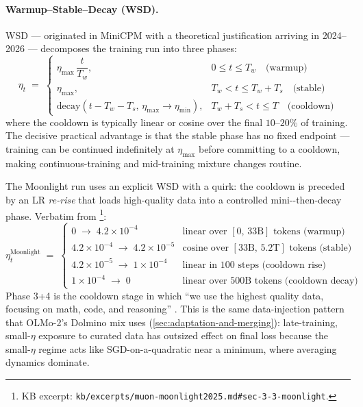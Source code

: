 \paragraph{Warmup--Stable--Decay (WSD).}
WSD --- originated in MiniCPM \citep{phi4} with a
theoretical justification arriving in
2024--2026  --- decomposes the training run into three phases:
\begin{equation}
\eta_t \;=\;
\begin{cases}
\eta_{\max}\,\dfrac{t}{T_w}, & 0 \leq t \leq T_w \quad\text{(warmup)} \\[6pt]
\eta_{\max}, & T_w < t \leq T_w + T_s \quad\text{(stable)} \\[6pt]
\mathrm{decay}(t - T_w - T_s,\, \eta_{\max} \to \eta_{\min}), & T_w + T_s < t \leq T \quad\text{(cooldown)}
\end{cases}
\label{eq:wsd}
\end{equation}
where the cooldown is typically linear or cosine over the final
$10$--$20\%$ of training. The decisive practical advantage is that
the stable phase has no fixed endpoint --- training can be continued
indefinitely at $\eta_{\max}$ before committing to a cooldown,
making continuous-training and mid-training mixture changes routine.

The Moonlight  run uses an explicit WSD with a quirk: the
cooldown is preceded by an LR \emph{re-rise} that loads
high-quality data into a controlled mini--then-decay phase.
Verbatim from \citet[\S
3.3]{muon-moonlight2025}\footnote{KB excerpt:
\nolinkurl{kb/excerpts/muon-moonlight2025.md#sec-3-3-moonlight}.}:
\begin{equation}
\eta_t^{\mathrm{Moonlight}} \;=\;
\begin{cases}
0 \;\to\; 4.2 \times 10^{-4} & \text{linear over $[0,\,33\text{B}]$ tokens (warmup)} \\[4pt]
4.2 \times 10^{-4} \;\to\; 4.2 \times 10^{-5} & \text{cosine over $[33\text{B},\,5.2\text{T}]$ tokens (stable)} \\[4pt]
4.2 \times 10^{-5} \;\to\; 1 \times 10^{-4} & \text{linear in 100 steps (cooldown rise)} \\[4pt]
1 \times 10^{-4} \;\to\; 0 & \text{linear over $500$B tokens (cooldown decay)}
\end{cases}
\label{eq:moonlight-schedule}
\end{equation}
Phase 3+4 is the cooldown stage in which ``we use the highest
quality data, focusing on math, code, and reasoning'' \citep[\S
3.3]{muon-moonlight2025}. This is the same data-injection pattern
that OLMo-2's Dolmino mix uses (\cref{sec:adaptation-and-merging}):
late-training, small-$\eta$ exposure to curated data has outsized
effect on final loss because the small-$\eta$ regime acts like
SGD-on-a-quadratic near a minimum, where averaging dynamics dominate.

